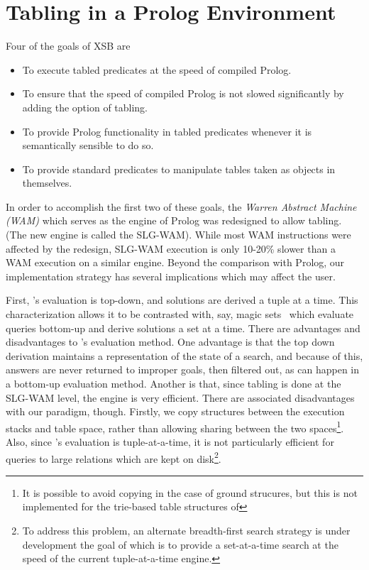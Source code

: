 \section{Tabling in a Prolog Environment}\label{tabling_env}

Four of the goals of XSB are 
\begin{itemize}
\item	To execute tabled predicates at the speed of compiled Prolog.
\item	To ensure that the speed of compiled Prolog is not slowed
	significantly by adding the option of tabling.
\item	To provide Prolog functionality in tabled predicates 
	whenever it is semantically sensible to do so.
\item	To provide standard predicates to manipulate tables
	taken as objects in themselves.
\end{itemize}

In order to accomplish the first two of these goals, the {\em Warren
Abstract Machine (WAM)} which serves as the engine of Prolog was
redesigned to allow tabling.  (The new engine is called the SLG-WAM).
While most WAM instructions were affected by the redesign, SLG-WAM
execution is only 10-20\% slower than a WAM execution on a similar
engine.  Beyond the comparison with Prolog, our implementation
strategy has several implications which may affect the user.

First, \ourprolog's evaluation is top-down, and solutions are derived
a tuple at a time.  This characterization allows it to be contrasted
with, say, magic sets~\cite{BMSU86} which evaluate queries
bottom-up and derive solutions a set at a time.  There are advantages
and disadvantages to \ourprolog's evaluation method.  One advantage is
that the top down derivation maintains a representation of the state
of a search, and because of this, answers are never returned to
improper goals, then filtered out, as can happen in a bottom-up
evaluation method.  Another is that, since tabling is done at the
SLG-WAM level, the engine is very efficient.  There are associated
disadvantages with our paradigm, though.  Firstly, we copy structures
between the execution stacks and table space, rather than allowing
sharing between the two spaces\footnote{It is possible to avoid
copying in the case of ground strucures, but this is not implemented
for the trie-based table structures of \version}.  Also, since
\ourprolog's evaluation is tuple-at-a-time, it is not particularly
efficient for queries to large relations which are kept on
disk\footnote{To address this problem, an alternate breadth-first
search strategy is under development the goal of which is to provide a
set-at-a-time search at the speed of the current tuple-at-a-time
engine.}.

